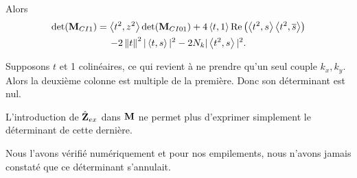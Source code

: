       Alors 
      \begin{multline*}
        \det( {\mathbf{M}}_{CI1}) = \left<{t^2},{z^2}\right>\det({\mathbf{M}}_{CI01}) + 4 \left<{t},{1}\right>\operatorname{Re}\left(\left<{t^2},{s}\right>\left<{t^2},{{\overline{s}}}\right>\right)
        \\
        - 2\left\lVert t\right\rVert^2|\left<{t},{s}\right>|^2 - 2 N_k|\left<{t^2},{s}\right>|^2.
      \end{multline*}


      Supposons \(t\) et 1 colinéaires, ce qui revient à ne prendre qu'un seul couple \(k_x,k_y\).
      Alors la deuxième colonne est multiple de la première.
      Donc son déterminant est nul.

      L'introduction de \(\hat{\mathbf{Z}}_{ex}\) dans \(\mathbf{M}\) ne permet plus d'exprimer simplement le déterminant de cette dernière.

      Nous l'avons vérifié numériquement et pour nos empilements, nous n'avons jamais constaté que ce déterminant s'annulait.








